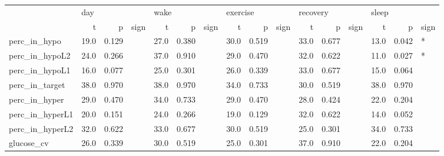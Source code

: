 \begin{tabular}{lrrlrrlrrlrrlrrl}
\toprule
{} & \multicolumn{3}{l}{day} & \multicolumn{3}{l}{wake} & \multicolumn{3}{l}{exercise} & \multicolumn{3}{l}{recovery} & \multicolumn{3}{l}{sleep} \\
{} &     t &      p & sign &     t &      p & sign &        t &      p & sign &        t &      p & sign &     t &      p & sign \\
\midrule
perc_in_hypo    &  19.0 &  0.129 &      &  27.0 &  0.380 &      &     30.0 &  0.519 &      &     33.0 &  0.677 &      &  13.0 &  0.042 &    * \\
perc_in_hypoL2  &  24.0 &  0.266 &      &  37.0 &  0.910 &      &     29.0 &  0.470 &      &     32.0 &  0.622 &      &  11.0 &  0.027 &    * \\
perc_in_hypoL1  &  16.0 &  0.077 &      &  25.0 &  0.301 &      &     26.0 &  0.339 &      &     33.0 &  0.677 &      &  15.0 &  0.064 &      \\
perc_in_target  &  38.0 &  0.970 &      &  38.0 &  0.970 &      &     34.0 &  0.733 &      &     30.0 &  0.519 &      &  38.0 &  0.970 &      \\
perc_in_hyper   &  29.0 &  0.470 &      &  34.0 &  0.733 &      &     29.0 &  0.470 &      &     28.0 &  0.424 &      &  22.0 &  0.204 &      \\
perc_in_hyperL1 &  20.0 &  0.151 &      &  24.0 &  0.266 &      &     19.0 &  0.129 &      &     32.0 &  0.622 &      &  14.0 &  0.052 &      \\
perc_in_hyperL2 &  32.0 &  0.622 &      &  33.0 &  0.677 &      &     30.0 &  0.519 &      &     25.0 &  0.301 &      &  34.0 &  0.733 &      \\
glucose_cv      &  26.0 &  0.339 &      &  30.0 &  0.519 &      &     25.0 &  0.301 &      &     37.0 &  0.910 &      &  22.0 &  0.204 &      \\
\bottomrule
\end{tabular}
